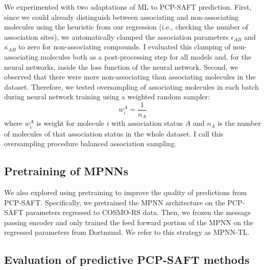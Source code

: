 We experimented with two adaptations of ML to PCP-SAFT prediction. First, since we could already distinguish between associating and non-associating molecules using the heuristic from our regression (i.e., checking the number of association sites), we automatically clamped the association parameters $\epsilon_{AB}$ and $\kappa_{AB}$ to zero for non-associating compounds. I evaluated this clamping of non-associating molecules both as a post-processing step for all models and, for the neural networks, inside the loss function of the neural network. Second, we observed that there were more non-associating than associating molecules in the dataset. Therefore, we tested oversampling of associating molecules in each batch during neural network training using a weighted random sampler:
\begin{equation}
    w_i^{A} = \frac{1}{n_A}
\end{equation}
where $w_i^{A}$ is weight for molecule $i$ with association status $A$ and $n_A$ is the number of molecules of that association status in the whole dataset. I call this oversampling procedure balanced association sampling.

\subsection{Pretraining of MPNNs}

We also explored using pretraining to improve the quality of predictions from PCP-SAFT. Specifically, we pretrained the MPNN architecture on the PCP-SAFT parameters regressed to COSMO-RS data. Then, we frozen the message passing encoder and only trained the feed forward portion of the MPNN on the regressed parameters from Dortmund. We refer to this strategy as MPNN-TL.

\subsection{Evaluation of predictive PCP-SAFT methods}

